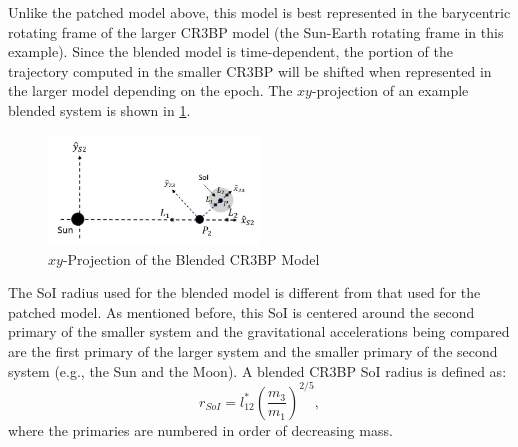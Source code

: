 Unlike the patched model above, this model is best represented in the barycentric rotating frame of
the larger CR3BP model (the Sun-Earth rotating frame in this example). Since the blended model is
time-dependent, the portion of the trajectory computed in the smaller CR3BP will be shifted when
represented in the larger model depending on the epoch. The $xy$-projection of an example blended
system is shown in \cref{fig:BlendedCR3BP}.

\begin{figure}[ht]
    \centering
    \includegraphics[width=0.5\textwidth]{figures/BlendCR3BP.jpg}
    \caption{$xy$-Projection of the Blended CR3BP Model}
    \label{fig:BlendedCR3BP}
\end{figure}

The SoI radius used for the blended model is different from that used for the patched model. As
mentioned before, this SoI is centered around the second primary of the smaller system and the
gravitational accelerations being compared are the first primary of the larger system and the
smaller primary of the second system (e.g., the Sun and the Moon). A blended CR3BP SoI radius is
defined as:
\begin{equation}
    r_{SoI}=l^{*}_{12}(\frac{m_{3}}{m_{1}})^{2/5},
    \label{eq:blendedSoI}
\end{equation}
where the primaries are numbered in order of decreasing mass\cite{Parker:2013}.
